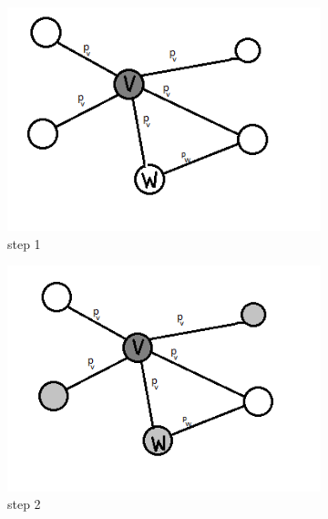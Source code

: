 \begin{figure}[!ht]
	\begin{subfigure}{0.3\textwidth}
		\includegraphics[width=\textwidth]{Figures/ICM}
		\caption{step 1 } 
		\label{fig:ICM}
	\end{subfigure}
	\begin{subfigure}{0.3\textwidth}
		\includegraphics[width=\textwidth]{Figures/ICM2}
		\caption{step 2} 
		\label{fig:ICM2}
	\end{subfigure}
	\begin{subfigure}{0.3\textwidth}

\end{subfigure}
\end{figure}
